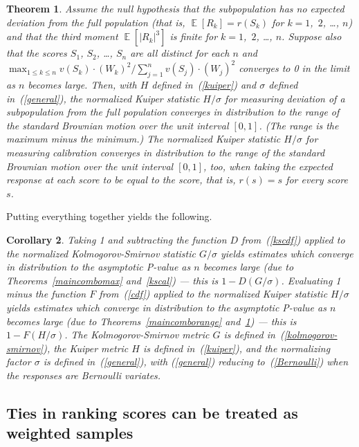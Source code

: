 \documentclass[12pt]{article}
\newtheorem{theorem}{Theorem}[]
\newtheorem{corollary}[theorem]{Corollary}
\DeclareMathOperator{\E}{\mathop{}\mathbb{E}}
\begin{document}
\begin{theorem}
\label{kucal}
Assume the null hypothesis that the subpopulation has no expected deviation
from the full population (that is, $\E[R_k] = r(S_k)$
for $k = 1$,~$2$, \dots, $n$) and that the third moment $\E[|R_k|^3]$ is finite
for $k = 1$,~$2$, \dots, $n$.
Suppose also that the scores $S_1$, $S_2$, \dots, $S_n$ are all distinct
for each $n$ and
$\max_{1 \le k \le n} v(S_k) \cdot (W_k)^2 / \sum_{j=1}^n v(S_j) \cdot (W_j)^2$
converges to 0 in the limit as $n$ becomes large.
Then, with $H$ defined in~(\ref{kuiper})
and $\sigma$ defined in~(\ref{general}),
the normalized Kuiper statistic $H/\sigma$
for measuring deviation of a subpopulation from the full population
converges in distribution to the range of the standard Brownian motion
over the unit interval $[0, 1]$.
(The range is the maximum minus the minimum.)
The normalized Kuiper statistic $H/\sigma$ for measuring calibration
converges in distribution to the range of the standard Brownian motion
over the unit interval $[0, 1]$, too, when taking the expected response
at each score to be equal to the score, that is, $r(s) = s$
for every score $s$.
\end{theorem}

Putting everything together yields the following.
%
\begin{corollary}
\label{corollary}
Taking 1 and subtracting the function $D$ from~(\ref{kscdf})
applied to the normalized Kolmogorov-Smirnov statistic $G/\sigma$
yields estimates which converge in distribution to the asymptotic P-value
as $n$ becomes large (due to Theorems~\ref{maincombomax}
and~\ref{kscal}) --- this is $1 - D(G/\sigma)$.
Evaluating 1 minus the function $F$ from~(\ref{cdf})
applied to the normalized Kuiper statistic $H/\sigma$
yields estimates which converge in distribution to the asymptotic P-value
as $n$ becomes large (due to Theorems~\ref{maincomborange}
and~\ref{kucal}) --- this is $1 - F(H/\sigma)$.
The Kolmogorov-Smirnov metric $G$ is defined in~(\ref{kolmogorov-smirnov}),
the Kuiper metric $H$ is defined in~(\ref{kuiper}),
and the normalizing factor $\sigma$ is defined in~(\ref{general}),
with (\ref{general}) reducing to~(\ref{Bernoulli})
when the responses are Bernoulli variates.
\end{corollary}



\subsection{Ties in ranking scores can be treated as weighted samples}
\label{reduction}
\end{document}
